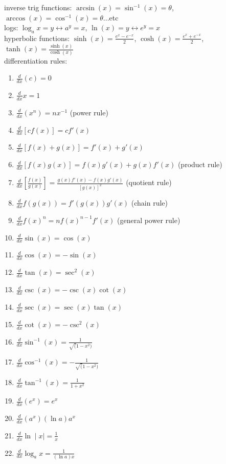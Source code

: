 \documentclass{article}
\begin{document}
inverse trig functions: $\arcsin(x) = \sin^{-1}(x) = \theta$, $\arccos(x) = \cos^{-1}(x) = \theta$...etc\\

logs: $\log_ax=y \leftrightarrow a^y = x$, $\ln(x)=y \leftrightarrow e^y=x$\\

hyperbolic functions: $\sinh(x) = \frac{e^x-e^{-x}}{2}$, $\cosh(x) = \frac{e^x+e^{-x}}{2}$, $\tanh(x) = \frac{\sinh(x)}{\cosh(x)}$\\

differentiation rules:
	\begin{enumerate}
		\item$\frac{d}{dx}(c) = 0$
		\item$\frac{d}{dx}x = 1$
		\item$\frac{d}{dx}(x^n) = nx^{-1}$ (power rule)
		\item$\frac{d}{dx}[cf(x)] = cf'(x)$
		\item$\frac{d}{dx}[f(x)+g(x)] = f'(x) + g'(x)$
		\item$\frac{d}{dx}[f(x)g(x)] = f(x)g'(x) + g(x)f'(x)$ (product rule)
		\item$\frac{d}{dx}[\frac{f(x)}{g(x)}] = \frac{g(x)f'(x) - f(x)g'(x)}{[g(x)]^2}$ (quotient rule)
		\item$\frac{d}{dx}f(g(x)) = f'(g(x))g'(x)$ (chain rule)
		\item$\frac{d}{dx}f(x)^n = nf(x)^{n-1}f'(x)$ (general power rule)
		\item$\frac{d}{dx}\sin(x) = \cos(x)$ 
		\item$\frac{d}{dx}\cos(x) = -\sin(x)$
		\item$\frac{d}{dx}\tan(x) = \sec^2(x)$
		\item$\frac{d}{dx}\csc(x) = -\csc(x)\cot(x)$
		\item$\frac{d}{dx}\sec(x) = \sec(x)\tan(x)$
		\item$\frac{d}{dx}\cot(x) = -\csc^2(x)$
		\item$\frac{d}{dx}\sin^{-1}(x) = \frac{1}{\sqrt(1 - x^2)}$
		\item$\frac{d}{dx}\cos^{-1}(x) = -\frac{1}{\sqrt(1 - x^2)}$
		\item$\frac{d}{dx}\tan^{-1}(x) = \frac{1}{1 + x^2}$
		\item$\frac{d}{dx}(e^x) = e^x$
		\item$\frac{d}{dx}(a^x) (\ln a)a^x$
		\item$\frac{d}{dx}\ln\mid x\mid = \frac{1}{x}$
		\item$\frac{d}{dx}\log_ax = \frac{1}{(\ln a)x}$
	\end{enumerate}
\end{document}
